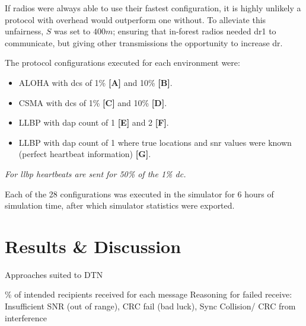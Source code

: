 
If radios were always able to use their fastest configuration, it is highly unlikely a protocol with overhead would outperform one without. To alleviate this unfairness, $S$ was set to $400m$; ensuring that in-forest radios needed \ac{dr}1 to communicate, but giving other transmissions the opportunity to increase \ac{dr}. 

The protocol configurations executed for each environment were:
\vspace{-5mm}
\begin{itemize}
\item ALOHA with \ac{dc}s of 1\% \textbf{[A]} and 10\% \textbf{[B]}.
\item CSMA with \ac{dc}s of 1\% \textbf{[C]} and 10\% \textbf{[D]}.
\item LLBP with \ac{dap} count of 1 \textbf{[E]} and 2 \textbf{[F]}.
\item LLBP with \ac{dap} count of 1 where true locations and \ac{snr} values were known (perfect heartbeat information) \textbf{[G]}. 
\end{itemize}
\vspace{-5mm}
\textit{For \ac{llbp} heartbeats are sent for 50\% of the 1\% \ac{dc}.}

Each of the 28 configurations was executed in the simulator for 6 hours of simulation time, after which simulator statistics were exported.

\section{Results \& Discussion}
Approaches suited to DTN








\% of intended recipients received for each message
Reasoning for failed receive: Insufficient SNR (out of range), CRC fail (bad luck), Sync Collision/ CRC from interference

